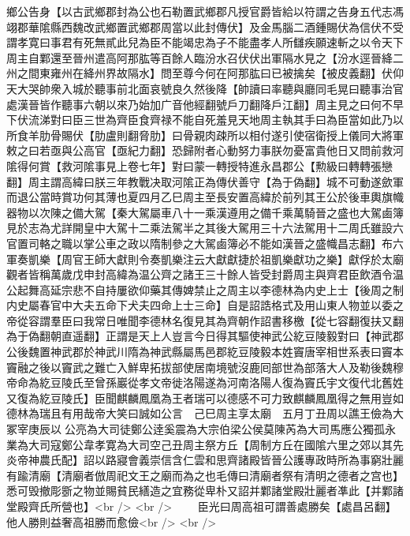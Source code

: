 鄉公告身【以古武鄉郡封為公也石勒置武鄉郡凡授官爵皆給以符謂之告身五代志馮翊郡華隂縣西魏改武鄉置武鄉郡周當以此封傳伏】及金馬腦二酒鍾賜伏為信伏不受謂孝寛曰事君有死無貳此兒為臣不能竭忠為子不能盡孝人所讎疾願速斬之以令天下周主自鄴還至晉州遣高阿那肱等百餘人臨汾水召伏伏出軍隔水見之【汾水逕晉絳二州之間東雍州在絳州界故隔水】問至尊今何在阿那肱曰已被擒矣【被皮義翻】伏仰天大哭帥衆入城於聽事前北面哀號良久然後降【帥讀曰率聽與廳同毛晃曰聽事治官處漢晉皆作聽事六朝以來乃始加广音他經翻號戶刀翻降戶江翻】周主見之曰何不早下伏流涕對曰臣三世為齊臣食齊禄不能自死羞見天地周主執其手曰為臣當如此乃以所食羊肋骨賜伏【肋盧則翻脅肋】曰骨親肉疎所以相付遂引使宿衛授上儀同大將軍敕之曰若亟與公高官【亟紀力翻】恐歸附者心動努力事朕勿憂富貴他日又問前救河隂得何賞【救河隂事見上卷七年】對曰蒙一轉授特進永昌郡公【勲級曰轉轉張戀翻】周主謂高緯曰朕三年教戰决取河隂正為傳伏善守【為于偽翻】城不可動遂歛軍而退公當時賞功何其薄也夏四月乙巳周主至長安置高緯於前列其王公於後車輿旗幟器物以次陳之備大駕【秦大駕屬車八十一乘漢遵用之備千乘萬騎晉之盛也大駕鹵簿見於志為尤詳開皇中大駕十二乘法駕半之其後大駕用三十六法駕用十二周氏雖設六官置司輅之職以掌公車之政以隋制參之大駕鹵簿必不能如漢晉之盛幟昌志翻】布六軍奏凱樂【周官王師大獻則令奏凱樂注云大獻獻捷於祖凱樂獻功之樂】獻俘於太廟觀者皆稱萬歲戊申封高緯為温公齊之諸王三十餘人皆受封爵周主與齊君臣飲酒令温公起舞高延宗悲不自持屢欲仰藥其傳婢禁止之周主以李德林為内史上士【後周之制内史屬春官中大夫五命下犬夫四命上士三命】自是詔誥格式及用山東人物並以委之帝從容謂羣臣曰我常日唯聞李德林名復見其為齊朝作詔書移檄【從七容翻復扶又翻為于偽翻朝直遥翻】正謂是天上人豈言今日得其驅使神武公紇豆陵毅對曰【神武郡公後魏置神武郡於神武川隋為神武縣屬馬邑郡紇豆陵毅本姓竇唐宰相世系表曰竇本竇融之後以竇武之難亡入鮮卑拓拔部使居南境號沒鹿囘部世為部落大人及勒後魏穆帝命為紇豆陵氏至曾孫巖從孝文帝徙洛陽遂為河南洛陽人復為竇氏宇文復代北舊姓又復為紇豆陵氏】臣聞麒麟鳳凰為王者瑞可以德感不可力致麒麟鳳凰得之無用豈如德林為瑞且有用哉帝大笑曰誠如公言　己巳周主享太廟　五月丁丑周以譙王儉為大冢宰庚辰以公亮為大司徒鄭公逹奚震為大宗伯梁公侯莫陳芮為大司馬應公獨孤永業為大司寇鄭公韋孝寛為大司空己丑周主祭方丘【周制方丘在國隂六里之郊以其先炎帝神農氏配】詔以路寢會義崇信含仁雲和思齊諸殿皆晉公護專政時所為事窮壯麗有踰清廟【清廟者倣周祀文王之廟而為之也毛傳曰清廟者祭有清明之德者之宫也】悉可毁撤彫斵之物並賜貧民繕造之宜務從卑朴又詔并鄴諸堂殿壯麗者凖此【并鄴諸堂殿齊氏所營也】<br />
<br />
　　臣光曰周高祖可謂善處勝矣【處昌呂翻】他人勝則益奢高祖勝而愈儉<br />
<br />
